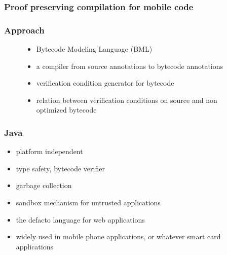 \documentclass{beamer}
\begin{document}
\begin{frame}[shrink]
\frametitle{Proof preserving compilation for mobile code}
\begin{figure}[hc]
\begin{center}
\end{center}
\end{figure}
\end{frame}

\begin{frame}[shrink]
\frametitle{Approach}
\begin{figure}[hc]
\begin{center}
\begin{itemize} 
       \item Bytecode Modeling Language (BML)  
       \item a compiler from source annotations to bytecode annotations
       \item verification condition generator for bytecode  
       \item relation between verification conditions on source and non optimized bytecode    
             
\end{itemize}
\end{center}
\end{figure}
\end{frame}


\begin{frame}[shrink]
\frametitle{Java}
\begin{itemize}
  \item platform independent
  \item type safety,  bytecode verifier
    \item garbage collection
       \item sandbox mechanism for untrusted applications %
\end{itemize}

\begin{itemize}
  \item the defacto language for web applications
  \item widely used in mobile phone applications, or whatever smart card applications
\end{itemize}
\end{frame}
\end{document}
